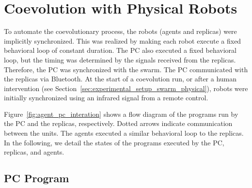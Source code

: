 \section{Coevolution with Physical Robots}\label{sec:coevolution_physical_robots_swarm_physical}

To automate the coevolutionary process, the robots (agents and replicas) were implicitly synchronized. This was realized by making each robot execute a fixed behavioral loop of constant duration. The PC also executed a fixed behavioral loop, but the timing was determined by the signals received from the replicas. Therefore, the PC was synchronized with the swarm. The PC communicated with the replicas via Bluetooth. At the start of a coevolution run, or after a human intervention (see Section~\ref{sec:experimental_setup_swarm_physical}), robots were initially synchronized using an infrared signal from a remote control.

Figure~\ref{fig:agent_pc_interation} shows a flow diagram of the programs run by the PC and the replicas, respectively. Dotted arrows indicate communication between the units. The agents executed a similar behavioral loop to the replicas. In the following, we detail the states of the programs executed by the PC, replicas, and agents.

\subsection{PC Program}

